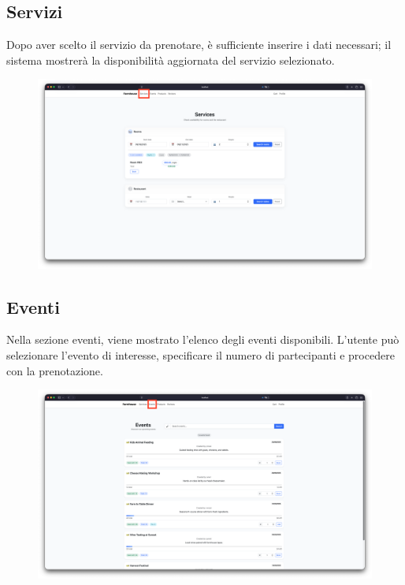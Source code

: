 \documentclass[a4paper,12pt]{report}
\begin{document}
\subsection*{Servizi}
Dopo aver scelto il servizio da prenotare, è sufficiente inserire i
dati necessari; il sistema
mostrerà la disponibilità aggiornata del servizio selezionato.

\begin{figure}[H]
  \centering
  \includegraphics[width=\textwidth, trim=0 0 0 0]{./img/users/services.png}
  \vspace{-1em}
  \label{fig:services}
\end{figure}

\subsection*{Eventi}
Nella sezione eventi, viene mostrato l'elenco degli eventi
disponibili. L'utente può selezionare
l'evento di interesse, specificare il numero di partecipanti e
procedere con la prenotazione.

\begin{figure}[H]
  \centering
  \includegraphics[width=\textwidth, trim=0 0 0 0]{./img/users/events.png}
  \vspace{-1em}
  \label{fig:events}
\end{figure}
\end{document}

